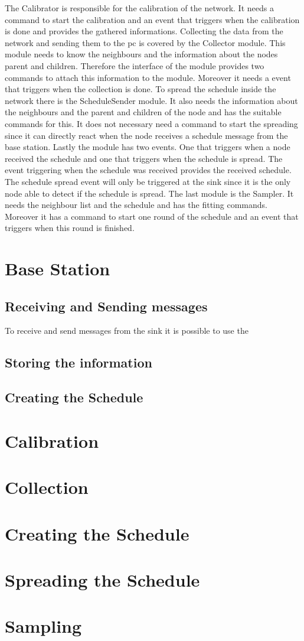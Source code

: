 The Calibrator is responsible for the calibration of the network. It needs a command to start the calibration and an event that triggers when the calibration is done and provides the gathered informations. Collecting the data from the network and sending them to the pc is covered by the Collector module. This module needs to know the neighbours and the information about the nodes parent and children. Therefore the interface of the module provides two commands to attach this information to the module. Moreover it needs a event that triggers when the collection is done. To spread the schedule inside the network there is the ScheduleSender module. It also needs the information about the neighbours and the parent and children of the node and has the suitable commands for this. It does not necessary need a command to start the spreading since it can directly react when the node receives a schedule message from the base station. Lastly the module has two events. One that triggers when a node received the schedule and one that triggers when the schedule is spread. The event triggering when the schedule was received provides the received schedule. The schedule spread event will only be triggered at the sink since it is the only node able to detect if the schedule is spread. The last module is the Sampler. It needs the neighbour list and the schedule and has the fitting commands. Moreover it has a command to start one round of the schedule and an event that triggers when this round is finished.  
\section{Base Station}
\subsection{Receiving and Sending messages}
To receive and send messages from the sink it is possible to use the 
\subsection{Storing the information}
\subsection{Creating the Schedule}
\section{Calibration}
\section{Collection}
\section{Creating the Schedule}
\section{Spreading the Schedule}
\section{Sampling}